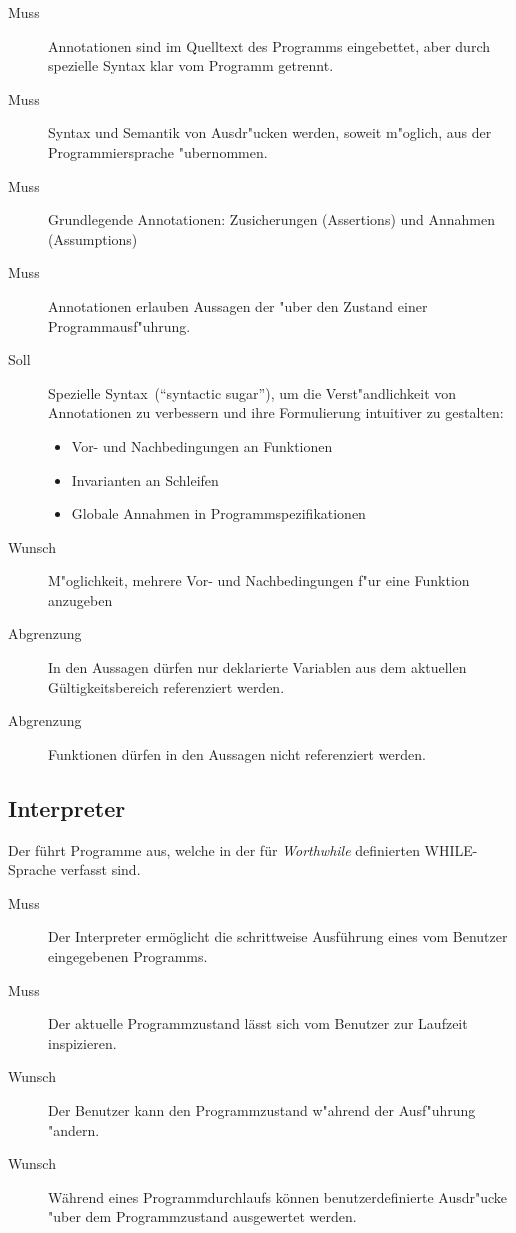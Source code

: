 \begin{description}%
    \item [Muss] Annotationen sind im Quelltext des Programms eingebettet, aber durch spezielle Syntax klar vom Programm getrennt.%
    \item [Muss] Syntax und Semantik von Ausdr"ucken werden, soweit m"oglich, aus der Programmiersprache "ubernommen.%
    \item [Muss] Grundlegende Annotationen: Zusicherungen (Assertions) und Annahmen (Assumptions)%
    \item [Muss] Annotationen erlauben Aussagen der  "uber den Zustand einer Programmausf"uhrung.%
    \item [Soll] Spezielle Syntax~("`syntactic sugar"'), um die Verst"andlichkeit von Annotationen zu verbessern und ihre Formulierung intuitiver zu gestalten:%
        \begin{itemize}%
            \item Vor- und Nachbedingungen an Funktionen%
            \item Invarianten an Schleifen%
            \item Globale Annahmen in Programmspezifikationen%
        \end{itemize}%
    \item [Wunsch] M"oglichkeit, mehrere Vor- und Nachbedingungen f"ur eine Funktion anzugeben%
    \item [Abgrenzung] In den Aussagen dürfen nur deklarierte Variablen aus dem aktuellen Gültigkeitsbereich referenziert werden.%
    \item [Abgrenzung] Funktionen dürfen in den Aussagen nicht referenziert werden.%
\end{description}%

\subsection{Interpreter}%

Der  führt Programme aus, welche in der für \textit{Worthwhile} definierten WHILE-Sprache verfasst sind.%

\begin{description}%
    \item[Muss] Der Interpreter ermöglicht die schrittweise Ausführung eines vom Benutzer eingegebenen Programms.%
    \item[Muss] Der aktuelle Programmzustand lässt sich vom Benutzer zur Laufzeit inspizieren.%
    \item[Wunsch] Der Benutzer kann den Programmzustand w"ahrend der Ausf"uhrung "andern.%
    \item[Wunsch] Während eines Programmdurchlaufs können benutzerdefinierte Ausdr"ucke "uber dem Programmzustand ausgewertet werden.%
\end{description}%

